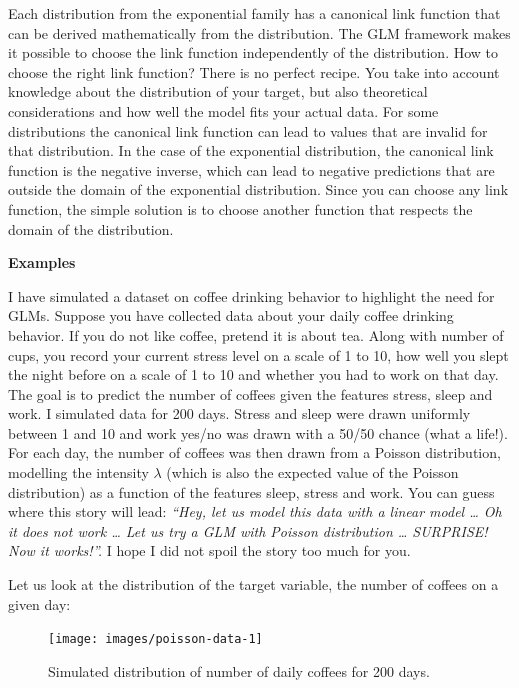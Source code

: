 \documentclass[
  12pt,
]{krantz}
\begin{document}
Each distribution from the exponential family has a canonical link function that can be derived mathematically from the distribution.
The GLM framework makes it possible to choose the link function independently of the distribution.
How to choose the right link function?
There is no perfect recipe.
You take into account knowledge about the distribution of your target, but also theoretical considerations and how well the model fits your actual data.
For some distributions the canonical link function can lead to values that are invalid for that distribution.
In the case of the exponential distribution, the canonical link function is the negative inverse, which can lead to negative predictions that are outside the domain of the exponential distribution.
Since you can choose any link function, the simple solution is to choose another function that respects the domain of the distribution.

\textbf{Examples}

I have simulated a dataset on coffee drinking behavior to highlight the need for GLMs.
Suppose you have collected data about your daily coffee drinking behavior.
If you do not like coffee, pretend it is about tea.
Along with number of cups, you record your current stress level on a scale of 1 to 10, how well you slept the night before on a scale of 1 to 10 and whether you had to work on that day.
The goal is to predict the number of coffees given the features stress, sleep and work.
I simulated data for 200 days.
Stress and sleep were drawn uniformly between 1 and 10 and work yes/no was drawn with a 50/50 chance (what a life!).
For each day, the number of coffees was then drawn from a Poisson distribution, modelling the intensity \(\lambda\) (which is also the expected value of the Poisson distribution) as a function of the features sleep, stress and work.
You can guess where this story will lead:
\emph{``Hey, let us model this data with a linear model \ldots{} Oh it does not work \ldots{} Let us try a GLM with Poisson distribution \ldots{} SURPRISE! Now it works!''.}
I hope I did not spoil the story too much for you.

Let us look at the distribution of the target variable, the number of coffees on a given day:

\begin{figure}

{\centering \texttt{[image: images/poisson-data-1]} 

}

\caption{Simulated distribution of number of daily coffees for 200 days.}\label{fig:poisson-data}
\end{figure}
\end{document}
